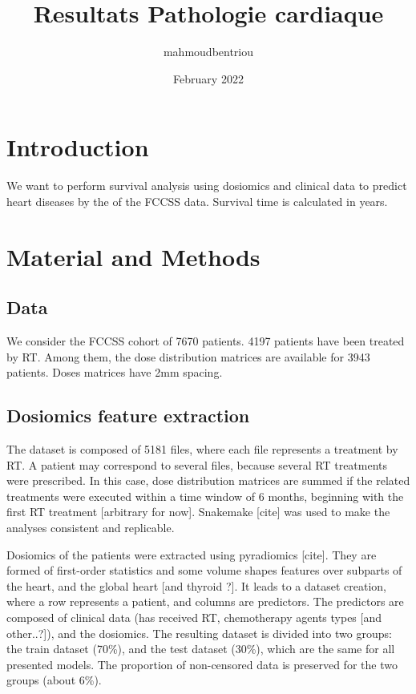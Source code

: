 \documentclass{article}
\title{Resultats Pathologie cardiaque}
\author{mahmoudbentriou }
\date{February 2022}
\begin{document}
\maketitle

\section{Introduction}

We want to perform survival analysis using dosiomics and clinical data to predict heart diseases by the of the FCCSS data. Survival time is calculated in years.

\section{Material and Methods}

\subsection{Data}

We consider the FCCSS cohort of 7670 patients. 4197 patients have been treated by RT. Among them, the dose distribution matrices are available for 3943 patients. Doses matrices have 2mm spacing.

\subsection{Dosiomics feature extraction}

The dataset is composed of 5181 files, where each file represents a treatment by RT. A patient may correspond to several files, because several RT treatments were prescribed. In this case, dose distribution matrices are summed if the related treatments were executed within a time window of 6 months, beginning with the first RT treatment [arbitrary for now]. Snakemake [cite] was used to make the analyses consistent and replicable.

Dosiomics of the patients were extracted using pyradiomics [cite]. They are formed of first-order statistics and some volume shapes features over subparts of the heart, and the global heart [and thyroid ?]. It leads to a dataset creation, where a row represents a patient, and columns are predictors. The predictors are composed of clinical data (has received RT, chemotherapy agents types [and other..?]), and the dosiomics.
The resulting dataset is divided into two groups: the train dataset (70\%), and the test dataset (30\%), which are the same for all presented models. The proportion of non-censored data is preserved for the two groups (about 6\%).
\end{document}
